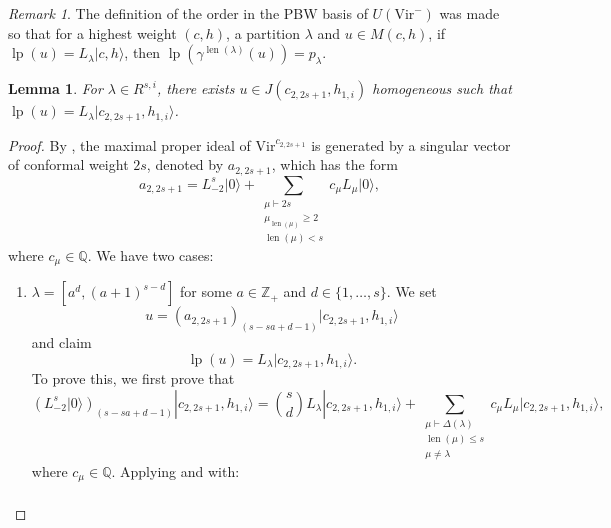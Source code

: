 \documentclass[a4paper, 12pt, reqno]{amsart}
\newtheorem{lemma}[theorem]{Lemma}
\theoremstyle{remark}
\newtheorem{remark}[theorem]{Remark}
\DeclareMathOperator{\len}{len}
\DeclareMathOperator{\lp}{lp}
\newcommand{\vac}{{|0\rangle}}
\newcommand{\Vir}{{\mathrm{Vir}}}
\begin{document}
\begin{remark}
  \label{rmk:1}
  The definition of the order in the PBW basis of $U(\Vir^-)$ was made so that for a highest weight $(c, h)$, a partition $\lambda$ and $u \in M(c, h)$, if $\lp(u) = L_\lambda|c, h\rangle$, then $\lp(\gamma^{\len(\lambda)}(u)) = p_\lambda$.
\end{remark}

\begin{lemma}
  \label{lmm:5}
  For $\lambda \in R^{s, i}$, there exists $u \in J(c_{2, 2s + 1}, h_{1, i})$ homogeneous such that $\lp(u) = L_\lambda|c_{2, 2s + 1}, h_{1, i}\rangle$.
\end{lemma}

\begin{proof}
  By , the maximal proper ideal of $\Vir^{c_{2, 2s + 1}}$ is generated by a singular vector of conformal weight $2s$, denoted by $a_{2, 2s + 1}$, which has the form
  \begin{equation}
    \label{eq:6}
    a_{2, 2s + 1} = L_{-2}^s\vac + \sum_{\substack{\mu \vdash 2s \\ \mu_{\len(\mu)} \ge 2 \\ \len(\mu) < s}}c_\mu L_\mu\vac,
  \end{equation}
  where $c_\mu \in \mathbb{Q}$.
  We have two cases:
  \begin{enumerate}
  \item $\lambda = [a^d, (a + 1)^{s - d}]$ for some $a \in \mathbb{Z}_+$ and $d \in \{1, \dots, s\}$.
    We set
    \begin{equation*}
      u = (a_{2, 2s + 1})_{(s - sa + d - 1)}|c_{2, 2s + 1}, h_{1, i}\rangle
    \end{equation*}
    and claim
    \begin{equation*}
      \lp(u) = L_\lambda|c_{2, 2s + 1}, h_{1, i}\rangle.
    \end{equation*}
    To prove this, we first prove that
    \begin{equation}
      \label{eq:7}
      (L_{-2}^s\vac)_{(s - sa + d - 1)}|c_{2, 2s + 1}, h_{1, i}\rangle = \binom{s}{d}L_\lambda|c_{2, 2s + 1}, h_{1, i}\rangle + \sum_{\substack{\mu \vdash \Delta(\lambda) \\ \len(\mu) \le s \\ \mu \neq \lambda}}c_\mu L_\mu|c_{2, 2s + 1}, h_{1, i}\rangle,
    \end{equation}
    where $c_\mu \in \mathbb{Q}$.
    Applying  and  with:
    \begin{align*}

\end{align*}
\end{enumerate}
\end{proof}
\end{document}
